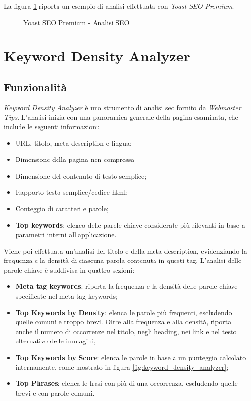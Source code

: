 \vspace{15pt}
\noindent La figura \ref{fig:yoast_seo} riporta un esempio di analisi effettuata con \textit{Yoast SEO Premium}.

\begin{figure}[H]
    \centering 
    \caption{Yoast SEO Premium - Analisi SEO}
    \label{fig:yoast_seo}
\end{figure}

\section{Keyword Density Analyzer}

\subsection{Funzionalità}
\textit{Keyword Density Analyzer} è uno strumento di analisi \gls{seo} fornito da \textit{Webmaster Tips}. L'analisi inizia con una panoramica generale della pagina esaminata, che include le seguenti informazioni:
\begin{itemize}
    \item URL, titolo, meta description e lingua;
    \item Dimensione della pagina non compressa;
    \item Dimensione del contenuto di testo semplice;
    \item Rapporto testo semplice/codice \gls{html};
    \item Conteggio di caratteri e parole;
    \item \textbf{Top keywords}: elenco delle parole chiave considerate più rilevanti in base a parametri interni all'applicazione.
\end{itemize}

\vspace{5pt}
\noindent Viene poi effettuata un'analisi del titolo e della meta description, evidenziando la frequenza e la densità di ciascuna parola contenuta in questi tag. L'analisi delle parole chiave è suddivisa in quattro sezioni:
\begin{itemize}
    \item \textbf{Meta tag keywords}: riporta la frequenza e la densità delle parole chiave specificate nel meta tag keywords;
    \item \textbf{Top Keywords by Density}: elenca le parole più frequenti, escludendo quelle comuni e troppo brevi. Oltre alla frequenza e alla densità, riporta anche il numero di occorrenze nel titolo, negli heading, nei link e nel testo alternativo delle immagini;
    \item \textbf{Top Keywords by Score}: elenca le parole in base a un punteggio calcolato internamente, come mostrato in figura \ref{fig:keyword_density_analyzer};
    \item \textbf{Top Phrases}: elenca le frasi con più di una occorrenza, escludendo quelle brevi e con parole comuni.
\end{itemize}

